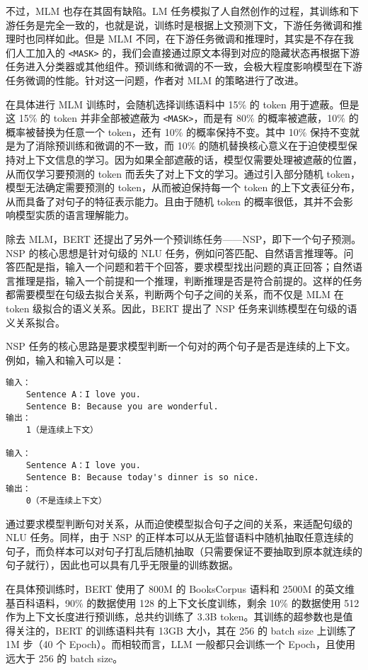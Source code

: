 \documentclass[
]{article}
\begin{document}
不过，MLM 也存在其固有缺陷。LM
任务模拟了人自然创作的过程，其训练和下游任务是完全一致的，也就是说，训练时是根据上文预测下文，下游任务微调和推理时也同样如此。但是
MLM 不同，在下游任务微调和推理时，其实是不存在我们人工加入的
\texttt{\textless{}MASK\textgreater{}}
的，我们会直接通过原文本得到对应的隐藏状态再根据下游任务进入分类器或其他组件。预训练和微调的不一致，会极大程度影响模型在下游任务微调的性能。针对这一问题，作者对
MLM 的策略进行了改进。

在具体进行 MLM 训练时，会随机选择训练语料中 15\% 的 token
用于遮蔽。但是这 15\% 的 token 并非全部被遮蔽为
\texttt{\textless{}MASK\textgreater{}}，而是有 80\% 的概率被遮蔽，10\%
的概率被替换为任意一个 token，还有 10\% 的概率保持不变。其中 10\%
保持不变就是为了消除预训练和微调的不一致，而 10\%
的随机替换核心意义在于迫使模型保持对上下文信息的学习。因为如果全部遮蔽的话，模型仅需要处理被遮蔽的位置，从而仅学习要预测的
token 而丢失了对上下文的学习。通过引入部分随机
token，模型无法确定需要预测的 token，从而被迫保持每一个 token
的上下文表征分布，从而具备了对句子的特征表示能力。且由于随机 token
的概率很低，其并不会影响模型实质的语言理解能力。

除去 MLM，BERT
还提出了另外一个预训练任务------NSP，即下一个句子预测。NSP
的核心思想是针对句级的 NLU
任务，例如问答匹配、自然语言推理等。问答匹配是指，输入一个问题和若干个回答，要求模型找出问题的真正回答；自然语言推理是指，输入一个前提和一个推理，判断推理是否是符合前提的。这样的任务都需要模型在句级去拟合关系，判断两个句子之间的关系，而不仅是
MLM 在 token 级拟合的语义关系。因此，BERT 提出了 NSP
任务来训练模型在句级的语义关系拟合。

NSP
任务的核心思路是要求模型判断一个句对的两个句子是否是连续的上下文。例如，输入和输入可以是：

\begin{verbatim}
输入：
    Sentence A：I love you.
    Sentence B: Because you are wonderful.
输出：
    1（是连续上下文）

输入：
    Sentence A：I love you.
    Sentence B: Because today's dinner is so nice.
输出：
    0（不是连续上下文）
\end{verbatim}

通过要求模型判断句对关系，从而迫使模型拟合句子之间的关系，来适配句级的
NLU 任务。同样，由于 NSP
的正样本可以从无监督语料中随机抽取任意连续的句子，而负样本可以对句子打乱后随机抽取（只需要保证不要抽取到原本就连续的句子就行），因此也可以具有几乎无限量的训练数据。

在具体预训练时，BERT 使用了 800M 的 BooksCorpus 语料和 2500M
的英文维基百科语料，90\% 的数据使用 128 的上下文长度训练，剩余 10\%
的数据使用 512 作为上下文长度进行预训练，总共约训练了 3.3B
token。其训练的超参数也是值得关注的，BERT 的训练语料共有 13GB 大小，其在
256 的 batch size 上训练了 1M 步（40 个 Epoch）。而相较而言，LLM
一般都只会训练一个 Epoch，且使用远大于 256 的 batch size。
\end{document}
